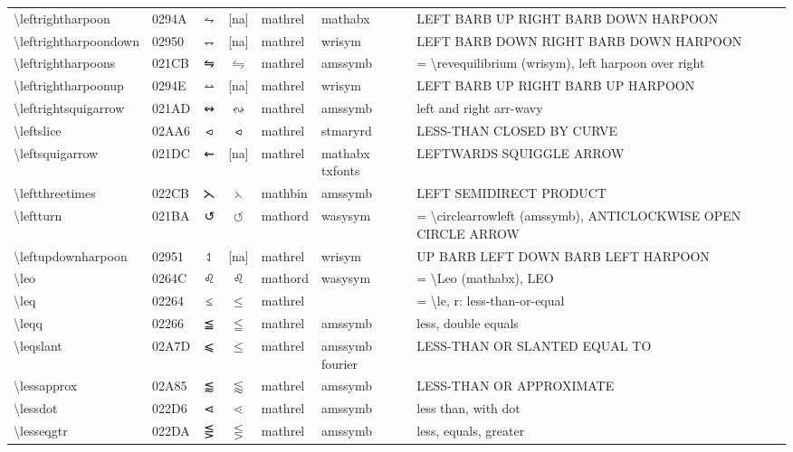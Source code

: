 \documentclass[a4paper,landscape]{article}
\begin{document}
\begin{longtable}{llcclll}
\textbackslash{}leftrightharpoon & 0294A & ⥊ & [na] & mathrel & mathabx & LEFT BARB UP RIGHT BARB DOWN HARPOON \\
\textbackslash{}leftrightharpoondown & 02950 & ⥐ & [na] & mathrel & wrisym & LEFT BARB DOWN RIGHT BARB DOWN HARPOON \\
\textbackslash{}leftrightharpoons & 021CB & ⇋ & $\leftrightharpoons$ & mathrel & amssymb & = \textbackslash{}revequilibrium (wrisym), left harpoon over right \\
\textbackslash{}leftrightharpoonup & 0294E & ⥎ & [na] & mathrel & wrisym & LEFT BARB UP RIGHT BARB UP HARPOON \\
\textbackslash{}leftrightsquigarrow & 021AD & ↭ & $\leftrightsquigarrow$ & mathrel & amssymb & left and right arr-wavy \\
\textbackslash{}leftslice & 02AA6 & ⪦ & $\leftslice$ & mathrel & stmaryrd & LESS-THAN CLOSED BY CURVE \\
\textbackslash{}leftsquigarrow & 021DC & ⇜ & [na] & mathrel & mathabx txfonts & LEFTWARDS SQUIGGLE ARROW \\
\textbackslash{}leftthreetimes & 022CB & ⋋ & $\leftthreetimes$ & mathbin & amssymb & LEFT SEMIDIRECT PRODUCT \\
\textbackslash{}leftturn & 021BA & ↺ & $\leftturn$ & mathord & wasysym & = \textbackslash{}circlearrowleft (amssymb),  ANTICLOCKWISE OPEN CIRCLE ARROW \\
\textbackslash{}leftupdownharpoon & 02951 & ⥑ & [na] & mathrel & wrisym & UP BARB LEFT DOWN BARB LEFT HARPOON \\
\textbackslash{}leo & 0264C & \textsf ♌ & $\leo$ & mathord & wasysym & = \textbackslash{}Leo (mathabx), LEO \\
\textbackslash{}leq & 02264 & ≤ & $\leq$ & mathrel &  & = \textbackslash{}le, r: less-than-or-equal \\
\textbackslash{}leqq & 02266 & ≦ & $\leqq$ & mathrel & amssymb & less, double equals \\
\textbackslash{}leqslant & 02A7D & ⩽ & $\leqslant$ & mathrel & amssymb fourier & LESS-THAN OR SLANTED EQUAL TO \\
\textbackslash{}lessapprox & 02A85 & ⪅ & $\lessapprox$ & mathrel & amssymb & LESS-THAN OR APPROXIMATE \\
\textbackslash{}lessdot & 022D6 & ⋖ & $\lessdot$ & mathrel & amssymb & less than, with dot \\
\textbackslash{}lesseqgtr & 022DA & ⋚ & $\lesseqgtr$ & mathrel & amssymb & less, equals, greater \\

\end{longtable}
\end{document}
